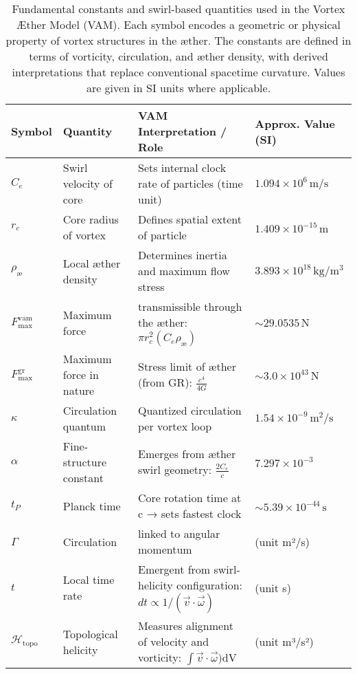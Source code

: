 \begin{table}[h!]
    \centering
    \footnotesize
    \begin{tabular}{|l|l|l|l|}
        \hline
        \toprule
        \textbf{Symbol} & \textbf{Quantity} & \textbf{VAM Interpretation / Role} & \textbf{Approx. Value (SI)} \\
        \hline
        \midrule
        $C_e$ & Swirl velocity of core & Sets internal clock rate of particles (time unit) & $1.094 \times 10^6 \,\mathrm{m/s} $\\
        $r_c$ & Core radius of vortex & Defines spatial extent of particle & $1.409 \times 10^{-15} \,\mathrm{m}$ \\
        $\rho_\text{\ae}$ & Local æther density & Determines inertia and maximum flow stress & $3.893 \times 10^{18} \,\mathrm{kg/m^3}$ \\
        $F^{\text{vam}}_\text{max}$ & Maximum force & transmissible through the æther: $\pi r_c^2 ({C_e} \rho_\text{\ae})$ & $\sim 29.0535\,\mathrm{N}$ \\
        $F^{\text{gr}}_\text{max}$ & Maximum force in nature & Stress limit of æther (from GR): $\frac{c^4}{4G}$ &  $\sim 3.0 \times 10^{43} \,\mathrm{N}$ \\
        $\kappa$ & Circulation quantum & Quantized circulation per vortex loop & $1.54 \times 10^{-9} \,\mathrm{m^2/s}$ \\
        $\alpha$ & Fine-structure constant & Emerges from æther swirl geometry: $\frac{2 C_e}{c}$ & $7.297 \times 10^{-3} $\\
        $t_P$ & Planck time & Core rotation time at c → sets fastest clock & $\sim 5.39 \times 10^{-44} \,\mathrm{s} $\\
        $\Gamma$ & Circulation & linked to angular momentum & (unit m²/s) \\
        $t$ & Local time rate & Emergent from swirl-helicity configuration: $dt \propto 1 / (\vec{v} \cdot \vec{\omega})$  & (unit s) \\
        $\mathcal{H}_\text{topo}$ & Topological helicity  & Measures alignment of velocity and vorticity: $\int \vec{v} \cdot \vec{\omega})$dV & (unit m³/s²)\\
        \hline
        \bottomrule
    \end{tabular}
    \caption{Fundamental constants and swirl-based quantities used in the Vortex Æther Model (VAM). Each symbol encodes a geometric or physical property of vortex structures in the æther. The constants are defined in terms of vorticity, circulation, and æther density, with derived interpretations that replace conventional spacetime curvature. Values are given in SI units where applicable.}
    \label{tab:VAM_master_table}
\end{table}


